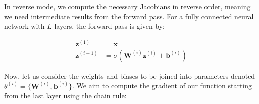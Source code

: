 


In reverse mode, we compute the necessary Jacobians in reverse order, meaning we need intermediate results from the forward pass. For a fully connected neural network with \( L \) layers, the forward pass is given by:

\begin{align*}
    \bm{z}^{(1)}   & = \bm{x}                                                        \\
    \bm{z}^{(i+1)} & = \sigma\left( \bm{W}^{(i)} \bm{z}^{(i)} + \bm{b}^{(i)} \right)
\end{align*}

Now, let us consider the weights and biases to be joined into parameters denoted \( \theta^{(i)} = \{ \bm{W}^{(i)}, \bm{b}^{(i)} \} \). We aim to compute the gradient of our function starting from the last layer using the chain rule:

